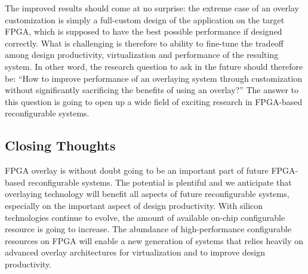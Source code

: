 The improved results should come at no surprise: the extreme case of an overlay customization is simply a full-custom design of the application on the target FPGA, which is supposed to have the best possible performance if designed correctly.
What is challenging is therefore to ability to fine-tune the tradeoff among design productivity, virtualization and performance of the resulting system.
In other word, the research question to ask in the future should therefore be: ``How to improve performance of an overlaying system through customization without significantly sacrificing the benefits of using an overlay?''
The answer to this question is going to open up a wide field of exciting research in FPGA-based reconfigurable systems.

\subsection{Closing Thoughts}
FPGA overlay is without doubt going to be an important part of future FPGA-based reconfigurable systems.
The potential is plentiful and we anticipate that overlaying technology will benefit all aspects of future reconfigurable systems, especially on the important aspect of design productivity.
With silicon technologies continue to evolve, the amount of available on-chip configurable resource is going to increase.
The abundance of high-performance configurable resources on FPGA will enable a new generation of systems that relies heavily on advanced overlay architectures for virtualization and to improve design productivity. 

